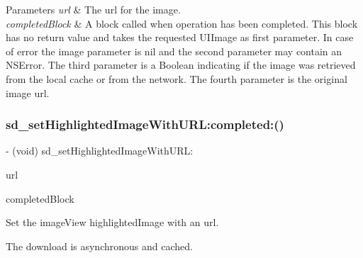 \begin{DoxyParams}{Parameters}
{\em url} & The url for the image. \\
\hline
{\em completed\+Block} & A block called when operation has been completed. This block has no return value and takes the requested U\+I\+Image as first parameter. In case of error the image parameter is nil and the second parameter may contain an N\+S\+Error. The third parameter is a Boolean indicating if the image was retrieved from the local cache or from the network. The fourth parameter is the original image url. \\
\hline
\end{DoxyParams}
\mbox{\label{category_u_i_image_view_07_highlighted_web_cache_08_a25316746c184695632dd8f4b36fd219c}} 
\subsubsection{\texorpdfstring{sd\+\_\+set\+Highlighted\+Image\+With\+U\+R\+L\+:completed\+:()}{sd\_setHighlightedImageWithURL:completed:()}\hspace{0.1cm}{\footnotesize\ttfamily [3/3]}}
{\footnotesize\ttfamily -\/ (void) sd\+\_\+set\+Highlighted\+Image\+With\+U\+R\+L\+: \begin{DoxyParamCaption}\item[{(N\+S\+U\+RL $\ast$)}]{url }\item[{completed:(S\+D\+Web\+Image\+Completion\+Block)}]{completed\+Block }\end{DoxyParamCaption}}

Set the image\+View {\ttfamily highlighted\+Image} with an {\ttfamily url}.

The download is asynchronous and cached.


